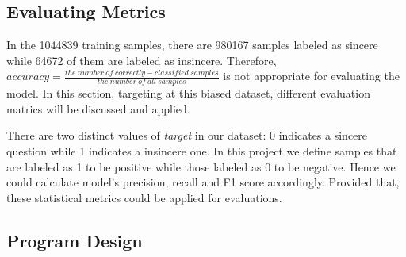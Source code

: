 \documentclass[12pt]{diazessay} %
\begin{document}
\subsection{Evaluating Metrics}

In the \num[group-separator={,}]{1044839} training samples, there are \num[group-separator={,}]{980167} samples labeled as sincere while \num[group-separator={,}]{64672} of them are labeled as insincere. Therefore, $accuracy = \frac{ the\ number\ of\ correctly-classified\ samples}{the\ number\ of\ all\ samples}$ is not appropriate for evaluating the model. In this section, targeting at this biased dataset, different evaluation matrics will be discussed and applied.

There are two distinct values of \textit{target} in our dataset: 0 indicates a sincere question while 1 indicates a insincere one. In this project we define samples that are labeled as 1 to be positive while those labeled as 0 to be negative. Hence we could calculate model's precision, recall and F1 score accordingly. Provided that, these statistical metrics could be applied for evaluations.





\subsection{Program Design}



















\newpage




\end{document}
